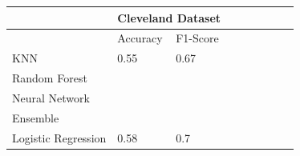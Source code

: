\documentclass[letterpaper]{article}
\begin{document}
\begin{table}[]
	\centering
	\begin{tabular}{|l|ll|ll|ll|ll|}
		\hline
		               			& \multicolumn{2}{l|}{Cleveland Dataset} \\ \hline
		               			& \multicolumn{1}{l|}{Accuracy}       & F1-Score \\ \hline
		KNN           		  & \multicolumn{1}{l|}{0.55}           & 0.67      \\ \hline                         
		Random Forest  			& \multicolumn{1}{l|}{}            		&       \\ \hline
		Neural Network  		& \multicolumn{1}{l|}{}            		&       \\ \hline
		Ensemble  					& \multicolumn{1}{l|}{}            		&      \\ \hline
		Logistic Regression & \multicolumn{1}{l|}{0.58}           & 0.7       \\ \hline


	\end{tabular}
\end{table}
\end{document}
